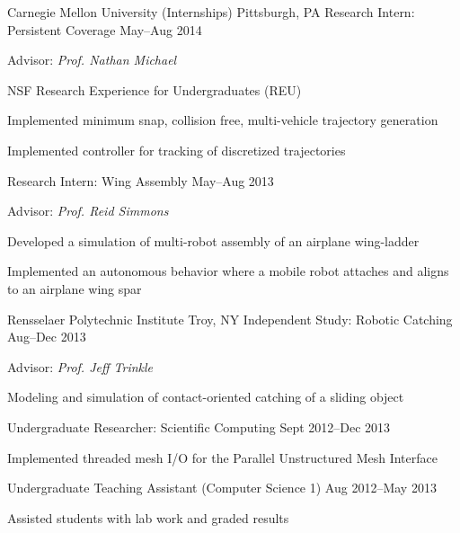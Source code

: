 \begin{cventries}
  \cventrytwo
  {Carnegie Mellon University (Internships)}
  {Pittsburgh, PA}
  {Research Intern: Persistent Coverage}
  {May--Aug 2014}
  {
    \begin{cvitems}
    \item Advisor: \emph{Prof. Nathan Michael}
    \item NSF Research Experience for Undergraduates (REU)
    \item Implemented minimum snap, collision free, multi-vehicle trajectory
      generation
    \item Implemented controller for tracking of discretized trajectories
    \end{cvitems}
  }
  {Research Intern: Wing Assembly}
  {May--Aug 2013}
  {
    \begin{cvitems}
    \item Advisor: \emph{Prof. Reid Simmons}
    \item Developed a simulation of multi-robot assembly of an airplane wing-ladder
    \item Implemented an autonomous behavior where a mobile robot attaches and
      aligns to an airplane wing spar
    \end{cvitems}
  }

  \cventrytwo
  {Rensselaer Polytechnic Institute}
  {Troy, NY}
  {Independent Study: Robotic Catching}
  {Aug--Dec 2013}
  {
    \begin{cvitems}
    \item Advisor: \emph{Prof. Jeff Trinkle}
    \item Modeling and simulation of contact-oriented catching of a sliding object
    \end{cvitems}
  }
  {Undergraduate Researcher: Scientific Computing}
  {Sept 2012--Dec 2013}
  {
    \begin{cvitems}
    \item Implemented threaded mesh I/O for the Parallel Unstructured Mesh Interface
    \end{cvitems}
  }

  \cventry
  {}
  {}
  {Undergraduate Teaching Assistant (Computer Science 1)}
  {Aug 2012--May 2013}
  {
    \begin{cvitems}
    \item Assisted students with lab work and graded results
    \end{cvitems}
  }
\end{cventries}
